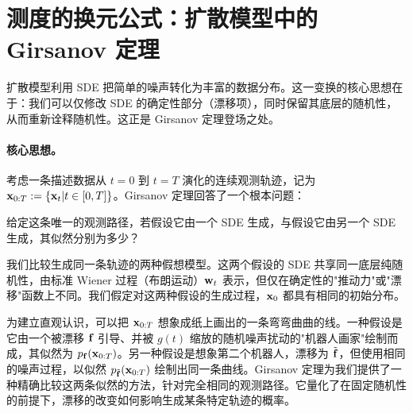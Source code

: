


\newpage

\section{测度的换元公式：扩散模型中的 Girsanov 定理}
扩散模型利用 SDE 把简单的噪声转化为丰富的数据分布。这一变换的核心思想在于：我们可以仅修改 SDE 的确定性部分（漂移项），同时保留其底层的随机性，从而重新诠释随机性。这正是 Girsanov 定理登场之处。


\paragraph{核心思想。}
考虑一条描述数据从 $t=0$ 到 $t=T$ 演化的连续观测轨迹，记为 ${\mathbf{x}}_{0:T}:=\{ {\mathbf{x}}_t|t \in [0,T] \}$。Girsanov 定理回答了一个根本问题：
\begin{question}
    给定这条唯一的观测路径，若假设它由一个 SDE 生成，与假设它由另一个 SDE 生成，其似然分别为多少？
\end{question}
我们比较生成同一条轨迹的两种假想模型。这两个假设的 SDE 共享同一底层纯随机性，由标准 Wiener 过程（布朗运动）${\mathbf{w}}_t$ 表示，但仅在确定性的"推动力"或"漂移"函数上不同。我们假定对这两种假设的生成过程，${\mathbf{x}}_0$ 都具有相同的初始分布。

为建立直观认识，可以把 ${\mathbf{x}}_{0:T}$ 想象成纸上画出的一条弯弯曲曲的线。一种假设是它由一个被漂移 ${\mathbf{f}}$ 引导、并被 $g(t)$ 缩放的随机噪声扰动的"机器人画家"绘制而成，其似然为 $p_{{\mathbf{f}}}({\mathbf{x}}_{0:T})$。另一种假设是想象第二个机器人，漂移为 $\tilde{{\mathbf{f}}}$，但使用相同的噪声过程，以似然 $p_{\tilde{{\mathbf{f}}}}({\mathbf{x}}_{0:T})$ 绘制出同一条曲线。Girsanov 定理为我们提供了一种精确比较这两条似然的方法，针对完全相同的观测路径。它量化了在固定随机性的前提下，漂移的改变如何影响生成某条特定轨迹的概率。

